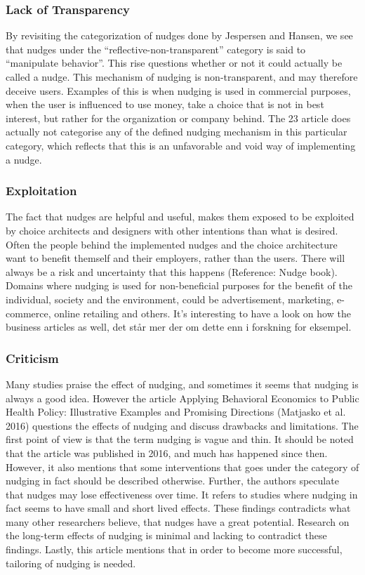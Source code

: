 \subsubsection{Lack of Transparency}
By revisiting the categorization of nudges done by Jespersen and Hansen, we see that nudges under the “reflective-non-transparent” category is said to “manipulate behavior”. This rise questions whether or not it could actually be called a nudge. This mechanism of nudging is non-transparent, and may therefore deceive users. Examples of this is when nudging is used in commercial purposes, when the user is influenced to use money, take a choice that is not in best interest, but rather for the organization or company behind. The 23 article does actually not categorise any of the defined nudging mechanism in this particular category, which reflects that this is an unfavorable and void way of implementing a nudge. 

\subsubsection{Exploitation}
The fact that nudges are helpful and useful, makes them exposed to be exploited by choice architects and designers with other intentions than what is desired. Often the people behind the implemented nudges and the choice architecture want to benefit themself and their employers, rather than the users. There will always be a risk and uncertainty that this happens (Reference: Nudge book). Domains where nudging is used for non-beneficial purposes for the benefit of the individual, society and the environment, could be advertisement, marketing, e-commerce, online retailing and others. It’s interesting to have a look on how the business articles as well, det står mer der om dette enn i forskning for eksempel. 

\subsubsection{Criticism}
Many studies praise the effect of nudging, and sometimes it seems that nudging is always a good idea. However the article Applying Behavioral Economics to Public Health Policy: Illustrative Examples and Promising Directions (Matjasko et al. 2016) questions the effects of nudging and discuss drawbacks and limitations. The first point of view is that the term nudging is vague and thin. It should be noted that the article was published in 2016, and much has happened since then. However, it also mentions that some interventions that goes under the category of nudging in fact should be described otherwise. Further, the authors speculate that nudges may lose effectiveness over time. It refers to studies where nudging in fact seems to have small and short lived effects. These findings contradicts what many other researchers believe, that nudges have a great potential. Research on the long-term effects of nudging is minimal and lacking to contradict these findings. Lastly, this article mentions that in order to become more successful, tailoring of nudging is needed. 

